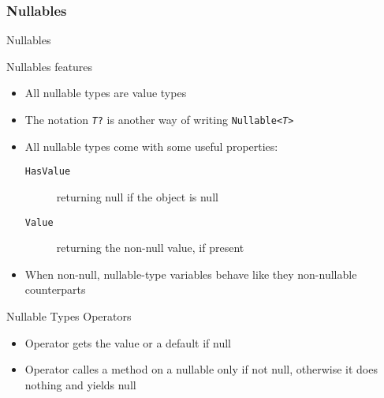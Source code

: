 \documentclass[presentation]{beamer}
\begin{document}
\subsubsection{Nullables}

\begin{frame}[shrink=5]{\dotnet Nullables}
    \begin{block}{Nullables features}
        \begin{itemize}
            \item All nullable types are \alert{value} types

            \item The notation \texttt{\textit{T}?} is another way of writing \texttt{Nullable<\textit{T}>}
            \item All nullable types come with some useful properties:
            \begin{description}
                \item[\texttt{HasValue}] returning null if the object is null
                \item[\texttt{Value}] returning the non-null value, if present
            \end{description}

            \item When non-null, nullable-type variables behave like they non-nullable counterparts
        \end{itemize}
    \end{block}
    
\end{frame}

\begin{frame}{Nullable Types Operators}
    \begin{block}{}
        \begin{itemize}
            \item Operator  gets the value or a default if null

            \item Operator  calles a method on a nullable only if not null, otherwise it does nothing and yields null
        \end{itemize}
    \end{block}

\end{frame}
\end{document}
